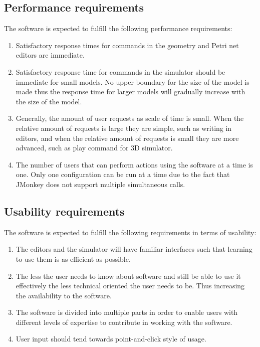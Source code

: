 \subsection{Performance requirements}
The software is expected to fulfill the following performance requirements:
\begin{enumerate}
	\item Satisfactory response times for commands in the geometry and Petri net editors are immediate.
	\item Satisfactory response time for commands in the simulator should be immediate for small models. No upper boundary for the size of the model is made thus the response time for larger models will gradually increase with the size of the model.
	\item Generally, the amount of user requests as scale of time is small. When the relative amount of requests is large they are simple, such as writing in editors, and when the relative amount of requests is small they are more advanced, such as play command for 3D simulator.
	\item The number of users that can perform actions using the software at a time is one. Only one configuration can be run at a time due to the fact that JMonkey does not support multiple simultaneous calls. 
\end{enumerate}

\subsection{Usability requirements}
The software is expected to fulfill the following requirements in terms of usability:
\begin{enumerate}
	\item The editors and the simulator will have familiar interfaces such that learning to use them is as efficient as possible.
	\item The less the user needs to know about software and still be able to use it effectively the less technical oriented the user needs to be. Thus increasing the availability to the software.
	\item The software is divided into multiple parts in order to enable users with different levels of expertise to contribute in working with the software.
	\item User input should tend towards point-and-click style of usage.
\end{enumerate}